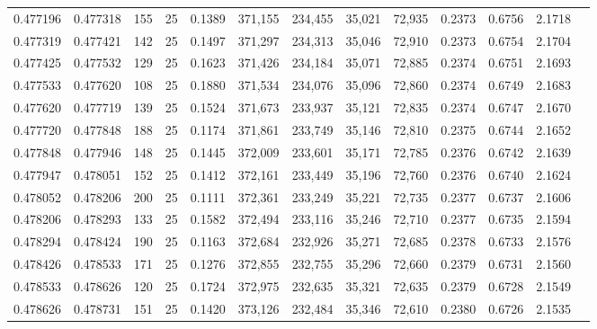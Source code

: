 \begin{tabular}{rrrrrrrrrrrrr}
0.477196 & 0.477318 &   155 &  25 &                                     0.1389 & 371,155 & 234,455 &  35,021 &  72,935 & 0.2373 & 0.6756 & 2.1718 \\
0.477319 & 0.477421 &   142 &  25 &                                     0.1497 & 371,297 & 234,313 &  35,046 &  72,910 & 0.2373 & 0.6754 & 2.1704 \\
0.477425 & 0.477532 &   129 &  25 &                                     0.1623 & 371,426 & 234,184 &  35,071 &  72,885 & 0.2374 & 0.6751 & 2.1693 \\
0.477533 & 0.477620 &   108 &  25 &                                     0.1880 & 371,534 & 234,076 &  35,096 &  72,860 & 0.2374 & 0.6749 & 2.1683 \\
0.477620 & 0.477719 &   139 &  25 &                                     0.1524 & 371,673 & 233,937 &  35,121 &  72,835 & 0.2374 & 0.6747 & 2.1670 \\
0.477720 & 0.477848 &   188 &  25 &                                     0.1174 & 371,861 & 233,749 &  35,146 &  72,810 & 0.2375 & 0.6744 & 2.1652 \\
0.477848 & 0.477946 &   148 &  25 &                                     0.1445 & 372,009 & 233,601 &  35,171 &  72,785 & 0.2376 & 0.6742 & 2.1639 \\
0.477947 & 0.478051 &   152 &  25 &                                     0.1412 & 372,161 & 233,449 &  35,196 &  72,760 & 0.2376 & 0.6740 & 2.1624 \\
0.478052 & 0.478206 &   200 &  25 &                                     0.1111 & 372,361 & 233,249 &  35,221 &  72,735 & 0.2377 & 0.6737 & 2.1606 \\
0.478206 & 0.478293 &   133 &  25 &                                     0.1582 & 372,494 & 233,116 &  35,246 &  72,710 & 0.2377 & 0.6735 & 2.1594 \\
0.478294 & 0.478424 &   190 &  25 &                                     0.1163 & 372,684 & 232,926 &  35,271 &  72,685 & 0.2378 & 0.6733 & 2.1576 \\
0.478426 & 0.478533 &   171 &  25 &                                     0.1276 & 372,855 & 232,755 &  35,296 &  72,660 & 0.2379 & 0.6731 & 2.1560 \\
0.478533 & 0.478626 &   120 &  25 &                                     0.1724 & 372,975 & 232,635 &  35,321 &  72,635 & 0.2379 & 0.6728 & 2.1549 \\
0.478626 & 0.478731 &   151 &  25 &                                     0.1420 & 373,126 & 232,484 &  35,346 &  72,610 & 0.2380 & 0.6726 & 2.1535 \\

\end{tabular}
